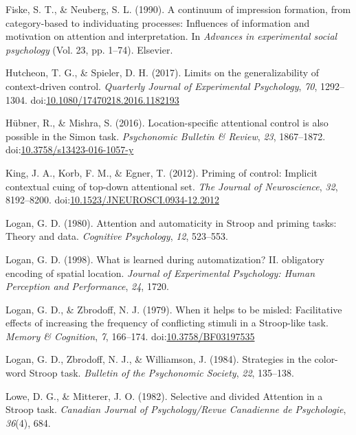 \documentclass[english,,man,floatsintext]{apa6}
\begin{document}
\hypertarget{ref-fiske_continuum_1990}{}
Fiske, S. T., \& Neuberg, S. L. (1990). A continuum of impression
formation, from category-based to individuating processes: Influences of
information and motivation on attention and interpretation. In
\emph{Advances in experimental social psychology} (Vol. 23, pp. 1--74).
Elsevier.

\hypertarget{ref-hutcheon_limits_2017}{}
Hutcheon, T. G., \& Spieler, D. H. (2017). Limits on the
generalizability of context-driven control. \emph{Quarterly Journal of
Experimental Psychology}, \emph{70}, 1292--1304.
doi:\href{https://doi.org/10.1080/17470218.2016.1182193}{10.1080/17470218.2016.1182193}

\hypertarget{ref-hubner_location-specific_2016}{}
Hübner, R., \& Mishra, S. (2016). Location-specific attentional control
is also possible in the Simon task. \emph{Psychonomic Bulletin \&
Review}, \emph{23}, 1867--1872.
doi:\href{https://doi.org/10.3758/s13423-016-1057-y}{10.3758/s13423-016-1057-y}

\hypertarget{ref-king_priming_2012}{}
King, J. A., Korb, F. M., \& Egner, T. (2012). Priming of control:
Implicit contextual cuing of top-down attentional set. \emph{The Journal
of Neuroscience}, \emph{32}, 8192--8200.
doi:\href{https://doi.org/10.1523/JNEUROSCI.0934-12.2012}{10.1523/JNEUROSCI.0934-12.2012}

\hypertarget{ref-logan_attention_1980}{}
Logan, G. D. (1980). Attention and automaticity in Stroop and priming
tasks: Theory and data. \emph{Cognitive Psychology}, \emph{12},
523--553.

\hypertarget{ref-logan_what_1998}{}
Logan, G. D. (1998). What is learned during automatization? II.
obligatory encoding of spatial location. \emph{Journal of Experimental
Psychology: Human Perception and Performance}, \emph{24}, 1720.

\hypertarget{ref-logan_when_1979}{}
Logan, G. D., \& Zbrodoff, N. J. (1979). When it helps to be misled:
Facilitative effects of increasing the frequency of conflicting stimuli
in a Stroop-like task. \emph{Memory \& Cognition}, \emph{7}, 166--174.
doi:\href{https://doi.org/10.3758/BF03197535}{10.3758/BF03197535}

\hypertarget{ref-logan_strategies_1984}{}
Logan, G. D., Zbrodoff, N. J., \& Williamson, J. (1984). Strategies in
the color-word Stroop task. \emph{Bulletin of the Psychonomic Society},
\emph{22}, 135--138.

\hypertarget{ref-lowe_selective_1982}{}
Lowe, D. G., \& Mitterer, J. O. (1982). Selective and divided Attention
in a Stroop task. \emph{Canadian Journal of Psychology/Revue Canadienne
de Psychologie}, \emph{36}(4), 684.
\end{document}
